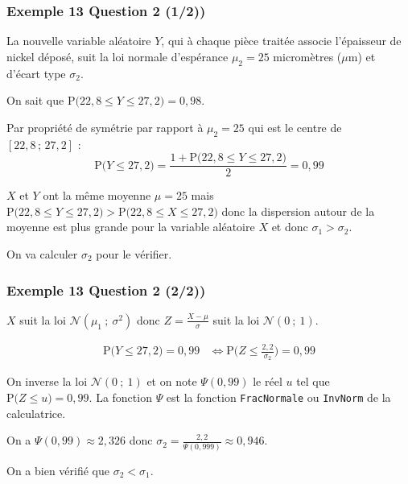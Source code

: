 \documentclass[xcolor=svgnames,t,final]{beamer}
\newcommand{\Interff}[2]{\left[#1\, ;\, #2\right]}
\newcommand{\loinorm}[2]{\mathcal{N}\left(#1\ ; \ #2 \right)}
\newcommand{\proba}[1]{\text{P}\big(#1\big)}
\begin{document}
\begin{frame}

\frametitle{Exemple 13 Question 2 (1/2))}

La nouvelle variable aléatoire $Y$, qui à chaque pièce traitée associe l'épaisseur de nickel déposé, suit la loi normale d'espérance $\mu_2 = 25$ micromètres ($\mu$m) et d'écart type $\sigma_2$. 

On sait que $\proba{22,8 \leqslant Y \leqslant 27,2} = 0,98$.

Par propriété de symétrie par rapport à $\mu_2 = 25$ qui est le centre de $\Interff{22,8}{27,2}$ :
\begin{equation*}
\proba{Y \leqslant 27,2} = \frac{1+\proba{22,8 \leqslant Y \leqslant 27,2}}{2} = 0,99
\end{equation*}


$X$ et $Y$ ont la même moyenne $\mu = 25$ mais $\proba{22,8 \leqslant Y \leqslant 27,2} > \proba{22,8 \leqslant X \leqslant 27,2}$ donc la dispersion autour de la moyenne est plus grande pour la variable aléatoire $X$ et donc $\boxed{\sigma_{1}>\sigma_{2}}$.

On va calculer $\sigma_{2}$ pour le vérifier.


\end{frame}


\begin{frame}

\frametitle{Exemple 13 Question 2 (2/2))}

$X$ suit la loi $\loinorm{\mu_{1}}{\sigma^{2}}$ donc $Z=\frac{X - \mu}{\sigma}$ suit la loi $\loinorm{0}{1}$.

\begin{align*}
\proba{ Y \leqslant 27,2} = 0,99  & \Longleftrightarrow  \proba{ Z \leqslant \frac{2,2}{\sigma_{2}}} = 0,99 
\end{align*}


On inverse la loi $\loinorm{0}{1}$ et on note $\Psi(0,99)$ le réel $u$ tel que $\proba{Z \leqslant u} = 0,99$.
La fonction $\Psi$ est la fonction \texttt{FracNormale} ou \texttt{InvNorm} de la calculatrice.

On a $\Psi(0,99) \approx 2,326$ donc $\boxed{\sigma_{2} = \frac{2,2}{\Psi(0,999)} \approx 0,946}$.

On a bien vérifié  que $\boxed{\sigma_{2} < \sigma_{1}}$.

\end{frame}
\end{document}
